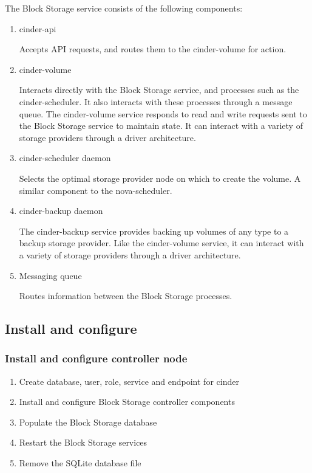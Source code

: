         \par The Block Storage service consists of the following components:
        \begin{enumerate}
            \item cinder-api
            \par Accepts API requests, and routes them to the cinder-volume for action.
        
            \item cinder-volume
            \par Interacts directly with the Block Storage service, and processes such as the cinder-scheduler. It also interacts with these processes through a message queue. The cinder-volume service responds to read and write requests sent to the Block Storage service to maintain state. It can interact with a variety of storage providers through a driver architecture.
        
            \item cinder-scheduler daemon
            \par Selects the optimal storage provider node on which to create the volume. A similar component to the nova-scheduler.
        
            \item cinder-backup daemon
            \par The cinder-backup service provides backing up volumes of any type to a backup storage provider. Like the cinder-volume service, it can interact with a variety of storage providers through a driver architecture.
        
            \item Messaging queue
            \par Routes information between the Block Storage processes.
        \end{enumerate}
    \subsection{Install and configure}
    \subsubsection{Install and configure controller node}
        \begin{enumerate}
            \item Create database, user, role, service and endpoint for cinder
            \item Install and configure Block Storage controller components
            \item Populate the Block Storage database
            \item Restart the Block Storage services
            \item Remove the SQLite database file
        \end{enumerate}   
